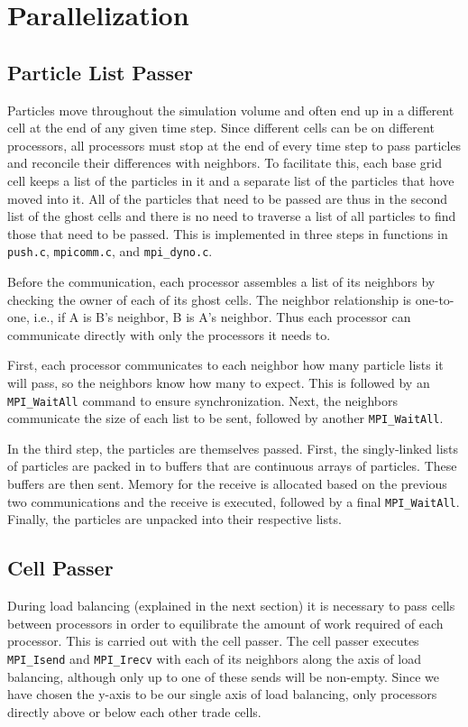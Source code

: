 \documentclass[]{article}
\begin{document}
\section{Parallelization}

\subsection{Particle List Passer}
Particles move throughout the simulation volume and often end up in a different cell at the end of any given time step.  Since different cells can be on different processors, all processors must stop at the end of every time step to pass particles and reconcile their differences with neighbors.  To facilitate this, each base grid cell keeps a list of the particles in it and a separate list of the particles that hove moved into it.  All of the particles that need to be passed are thus in the second list of the ghost cells and there is no need to traverse a list of all particles to find those that need to be passed.  This is implemented in three steps in functions in \texttt{push.c}, \texttt{mpicomm.c}, and \texttt{mpi\_dyno.c}.

Before the communication, each processor assembles a list of its neighbors by checking the owner of each of its ghost cells.  The neighbor relationship is one-to-one, i.e., if A is B's neighbor, B is A's neighbor.  Thus each processor can communicate directly with only the processors it needs to.

First, each processor communicates to each neighbor how many particle lists it will pass, so the neighbors know how many to expect.  This is followed by an \texttt{MPI\_WaitAll} command to ensure synchronization.  Next, the neighbors communicate the size of each list to be sent, followed by another \texttt{MPI\_WaitAll}.

In the third step, the particles are themselves passed.  First, the singly-linked lists of particles are packed in to buffers that are continuous arrays of particles.  These buffers are then sent.  Memory for the receive is allocated based on the previous two communications and the receive is executed, followed by a final \texttt{MPI\_WaitAll}.  Finally, the particles are unpacked into their respective lists.

\subsection{Cell Passer}
During load balancing (explained in the next section) it is necessary to pass cells between processors in order to equilibrate the amount of work required of each processor. This is carried out with the cell passer. The cell passer executes \texttt{MPI\_Isend} and \texttt{MPI\_Irecv} with each of its neighbors along the axis of load balancing, although only up to one of these sends will be non-empty. Since we have chosen the y-axis to be our single axis of load balancing, only processors directly above or below each other trade cells. 
\end{document}
